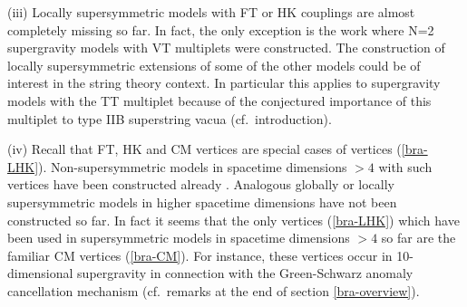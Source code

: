 \documentclass[a4paper,12pt]{article}
\begin{document}
(iii) Locally supersymmetric models with FT or HK couplings
are almost completely missing so far. In fact, the only
exception is the work \cite{bra-7} where N=2 supergravity
models with VT multiplets were constructed.
The construction of locally supersymmetric extensions
of some of the other models could be of interest 
in the string theory context. In particular this
applies to supergravity models with the TT multiplet because of
the conjectured importance of this multiplet to
type IIB superstring vacua (cf.\ introduction).

(iv) Recall that FT, HK and CM vertices are special
cases of vertices (\ref{bra-LHK}). Non-supersymmetric
models in spacetime dimensions $>4$ with such vertices
have been constructed already \cite{bra-HK1,bra-BST}. Analogous
globally or locally supersymmetric models in
higher spacetime dimensions have not been constructed
so far. In fact it seems that the only vertices  (\ref{bra-LHK}) 
which have been used in supersymmetric models in
spacetime dimensions $>4$ so far are the familiar
CM vertices (\ref{bra-CM}). For instance, these vertices
occur in 10-dimensional supergravity in connection with
the Green-Schwarz anomaly cancellation mechanism
(cf.\ remarks at the end of section \ref{bra-overview}).
\newpage
\end{document}
